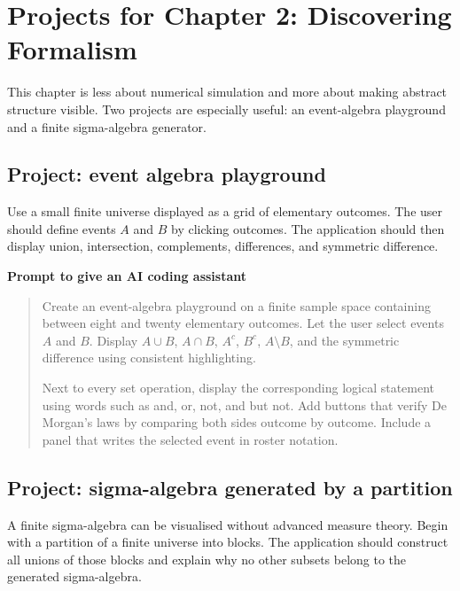 \section{Projects for Chapter 2: Discovering Formalism}

This chapter is less about numerical simulation and more about making abstract structure visible. Two projects are especially useful: an event-algebra playground and a finite sigma-algebra generator.

\subsection*{Project: event algebra playground}

Use a small finite universe displayed as a grid of elementary outcomes. The user should define events \(A\) and \(B\) by clicking outcomes. The application should then display union, intersection, complements, differences, and symmetric difference.

\begin{examplebox}
\textbf{Prompt to give an AI coding assistant}

\begin{quote}\small
Create an event-algebra playground on a finite sample space containing between eight and twenty elementary outcomes. Let the user select events \(A\) and \(B\). Display \(A\cup B\), \(A\cap B\), \(A^c\), \(B^c\), \(A\setminus B\), and the symmetric difference using consistent highlighting.

Next to every set operation, display the corresponding logical statement using words such as and, or, not, and but not. Add buttons that verify De Morgan's laws by comparing both sides outcome by outcome. Include a panel that writes the selected event in roster notation.
\end{quote}
\end{examplebox}

\subsection*{Project: sigma-algebra generated by a partition}

A finite sigma-algebra can be visualised without advanced measure theory. Begin with a partition of a finite universe into blocks. The application should construct all unions of those blocks and explain why no other subsets belong to the generated sigma-algebra.

